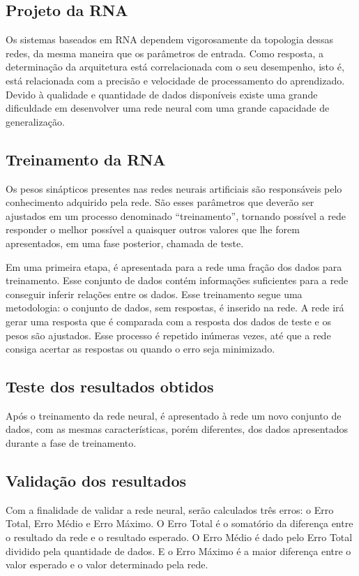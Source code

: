 \subsection{Projeto da RNA}

Os sistemas baseados em RNA dependem vigorosamente da topologia dessas redes, da mesma maneira que os parâmetros de entrada. Como resposta, a determinação da arquitetura está correlacionada com o seu desempenho, isto é, está relacionada com a precisão e velocidade de processamento do aprendizado. Devido à qualidade e quantidade de dados disponíveis existe uma grande dificuldade em desenvolver uma rede neural com uma grande capacidade de generalização.

\subsection{Treinamento da RNA}

Os pesos sinápticos presentes nas redes neurais artificiais são responsáveis pelo conhecimento adquirido pela rede. São esses parâmetros que deverão ser ajustados em um processo denominado “treinamento”, tornando possível a rede responder o melhor possível a quaisquer outros valores que lhe forem apresentados, em uma fase posterior, chamada de teste.

Em uma primeira etapa, é apresentada para a rede uma fração dos dados para treinamento. Esse conjunto de dados contém informações suficientes para a rede conseguir inferir relações entre os dados. Esse treinamento segue uma metodologia: o conjunto de dados, sem respostas, é inserido na rede. A rede irá gerar uma resposta que é comparada com a resposta dos dados de teste e os pesos são ajustados. Esse processo é repetido inúmeras vezes, até que a rede consiga acertar as respostas ou quando o erro seja minimizado. 

\subsection{Teste dos resultados obtidos}

Após o treinamento da rede neural, é apresentado à rede um novo conjunto de dados, com as mesmas características, porém diferentes, dos dados apresentados durante a fase de treinamento. 

\subsection{Validação dos resultados}

Com a finalidade de validar a rede neural, serão calculados três erros: o Erro Total, Erro Médio e Erro Máximo. O Erro Total é o somatório da diferença entre o resultado da rede e o resultado esperado. O Erro Médio é dado pelo Erro Total dividido pela quantidade de dados. E o Erro Máximo é a maior diferença entre o valor esperado e o valor determinado pela rede.

